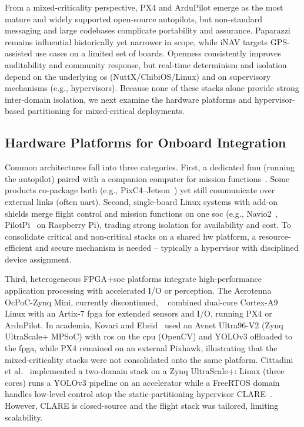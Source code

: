 From a mixed-criticality perspective, PX4 and ArduPilot emerge as the most
mature and widely supported open-source autopilots, but non-standard messaging and large codebases
complicate portability and assurance. Paparazzi remains influential historically
yet narrower in scope, while iNAV targets GPS-assisted use cases on a limited
set of boards. Openness consistently improves auditability and community
response, but real-time determinism and isolation depend on the underlying \gls{os}
(NuttX/ChibiOS/Linux) and on supervisory mechanisms (e.g., hypervisors).
Because none of these stacks alone provide strong inter-domain isolation, we
next examine the hardware platforms and hypervisor-based partitioning for mixed-critical deployments.

\subsection{Hardware Platforms for Onboard Integration}
\label{subsec:rw-hw-context}
Common architectures fall into three categories.
First, a dedicated \gls{fmu} (running the autopilot) paired with a companion
computer for mission functions~\cite{pixhawk4,arduPilot-cuavV5}. Some products
co-package both (e.g., PixC4–Jetson~\cite{jetson-docs}) yet still communicate
over external links (often \gls{uart}).
%
Second, single-board Linux systems with add-on shields merge flight control and
mission functions on one \gls{soc} (e.g., Navio2~\cite{navio2-px4},
PilotPi~\cite{px4-pilotpi} on Raspberry Pi), trading strong isolation for
availability and cost. To consolidate critical and non-critical stacks on a
shared \gls{hw} platform, a resource-efficient and secure mechanism is
needed -- typically a hypervisor with disciplined device assignment.

Third, heterogeneous FPGA+\gls{soc} platforms integrate high-performance
application processing with accelerated I/O or perception. The Aerotenna
OcPoC-Zynq Mini, currently discontinued, ~\cite{ocpoc,ocpoc-discontinued} combined dual-core Cortex-A9
Linux with an Artix-7 \gls{fpga} for extended sensors and I/O, running PX4 or
ArduPilot. In academia, Kovari and Ebeid~\cite{kovari_mpdrone_2021} used an
Avnet Ultra96-V2 (Zynq UltraScale+ MPSoC) with \gls{ros} on the \gls{cpu} (OpenCV) and
YOLOv3 offloaded to the \gls{fpga}, while PX4 remained on an external
Pixhawk, illustrating that the mixed-criticality stacks were not consolidated
onto the same platform. Cittadini et al.~\cite{cittadini_supporting_2023}
implemented a two-domain stack on a Zynq UltraScale+: Linux (three cores) runs a
YOLOv3 pipeline on an accelerator while a FreeRTOS domain handles low-level
control atop the static-partitioning hypervisor CLARE~\cite{clare-home}.
However, CLARE is closed-source and the flight stack was tailored, limiting
scalability.

